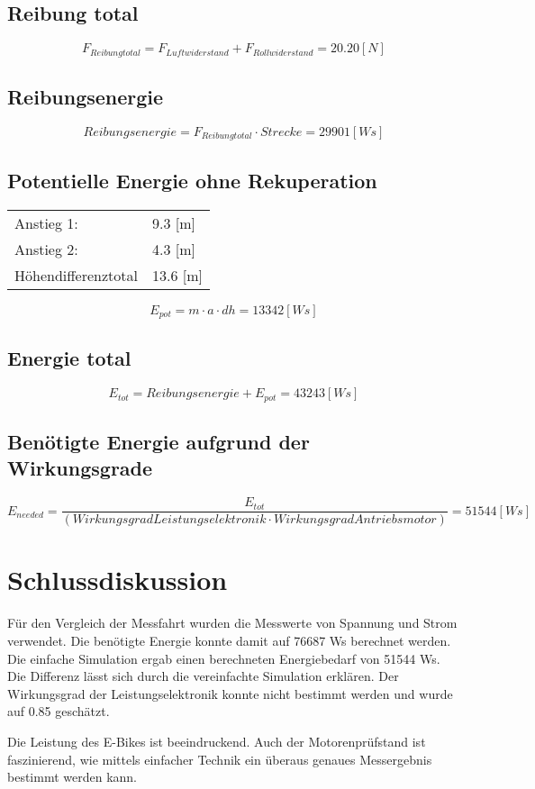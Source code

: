 \documentclass[a4,paper,fleqn]{article}
\begin{document}
\subsection{Reibung total}
\[ F_{Reibungtotal} = F_{Luftwiderstand} + F_{Rollwiderstand} = 20.20 [N]\]

\subsection{Reibungsenergie}
\[ Reibungsenergie = F_{Reibungtotal}  \cdot  Strecke = 29901 [Ws]\]

\subsection{Potentielle Energie ohne Rekuperation}
\begin{tabular}{ll}
Anstieg 1: & 9.3 [m]\\
Anstieg 2: & 4.3 [m]\\
Höhendifferenztotal & 13.6 [m]\\
\end{tabular}
\[ E_{pot} = m \cdot a \cdot dh = 13342 [Ws]\]

\subsection{Energie total}
\[ E_{tot} = Reibungsenergie + E_{pot} = 43243 [Ws]\]

\subsection{Benötigte Energie aufgrund der Wirkungsgrade}
\[ E_{needed} = \frac{E_{tot}}{(Wirkungsgrad Leistungselektronik \cdot Wirkungsgrad Antriebsmotor)} = 51544 [Ws] \]

\clearpage
\section{Schlussdiskussion}
Für den Vergleich der Messfahrt wurden die Messwerte von Spannung und Strom verwendet. Die benötigte Energie konnte damit auf 76687 Ws berechnet werden. Die einfache Simulation ergab einen berechneten Energiebedarf von 51544 Ws. Die Differenz lässt sich durch die vereinfachte Simulation erklären. Der Wirkungsgrad der Leistungselektronik konnte nicht bestimmt werden und wurde auf 0.85 geschätzt.

Die Leistung des E-Bikes ist beeindruckend. Auch der Motorenprüfstand ist faszinierend, wie mittels einfacher Technik ein überaus genaues Messergebnis bestimmt werden kann.

\clearpage
\begin{appendix}

\end{appendix}
\end{document}
